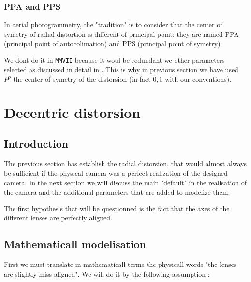 
\subsubsection{PPA and PPS}

In aerial photogrammetry, the "tradition" is to consider that the center of symetry of radial distortion
is different of principal point; they are named PPA (principal point of autocolimation) and
PPS (principal point of symetry).

We dont do it in {\tt MMVII} because it woul be redundant we other parameters 
selected as discussed in detail in \label{PPA:PPS:DEC}.
This is why in previous section we have used $P^p$ the center of symetry of the distorsion 
(in fact $0,0$ with our conventions).


\section{Decentric distorsion}
\label{DecMod}

\subsection{Introduction}
The previous section has establish the radial distorsion, that would almost always
be sufficient if the physical camera was a perfect realization of the designed camera.
In the next section we will discuss the main "default" in the realisation of
the camera and the additional parameters that are added to modelize them.

The first hypothesis  that will be questionned is the fact that the axes of the different
lenses are perfectly aligned.

\subsection{Mathematicall modelisation}

First we must translate in mathematicall terms the physicall words
"the lenses are slightly miss aligned".
We will do it by  the following assumption :

